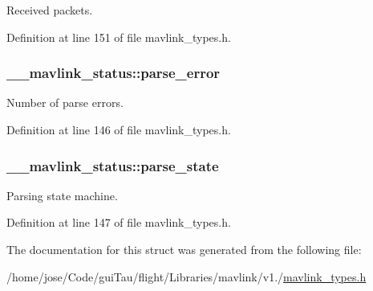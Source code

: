 Received packets. 



Definition at line 151 of file mavlink\-\_\-types.\-h.

\hypertarget{struct____mavlink__status_ae7a52aa0c84929dbf181220c689f9ec8}{
\subsubsection[{parse\-\_\-error}]{ \-\_\-\-\_\-mavlink\-\_\-status\-::parse\-\_\-error}}\label{struct____mavlink__status_ae7a52aa0c84929dbf181220c689f9ec8}


Number of parse errors. 



Definition at line 146 of file mavlink\-\_\-types.\-h.

\hypertarget{struct____mavlink__status_aaf6742a61bbc641a4600184b3260fa0f}{
\subsubsection[{parse\-\_\-state}]{ \-\_\-\-\_\-mavlink\-\_\-status\-::parse\-\_\-state}}\label{struct____mavlink__status_aaf6742a61bbc641a4600184b3260fa0f}


Parsing state machine. 



Definition at line 147 of file mavlink\-\_\-types.\-h.



The documentation for this struct was generated from the following file\-:\begin{DoxyCompactItemize}
\item 
/home/jose/\-Code/gui\-Tau/flight/\-Libraries/mavlink/v1./\hyperlink{mavlink__types_8h}{mavlink\-\_\-types.\-h}\end{DoxyCompactItemize}
